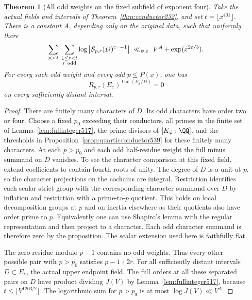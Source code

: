 \documentclass[a4paper,11pt]{article}
\newtheorem{theorem}[proposition]{Theorem}
\theoremstyle{definition}
\theoremstyle{remark}
\numberwithin{equation}{section}
\begin{document}
\begin{theorem}[All odd weights on the fixed subfield of exponent four]
\leavevmode\label{thm:oddquarticfield539}
Take the actual fields and intervals of
Theorem~\ref{thm:conductor232}, and set \(t=\lfloor x^{401}\rfloor\).
There is a constant \(A\), depending only on the original data,
such that uniformly there
\[
 \sum_{p>2}\ \sum_{\substack{1\le r<t\\ r\ {\rm odd}}}
   \log\big|\mathcal S_{p,r}(D)^{c=-1}\big|
        \ \ll_{\psi,\varepsilon}\ V^A+\exp(x^{2\varepsilon/3}).
\]
For every such odd weight and every odd \(p\le P(x)\), one has
\[
                 R_{p,r}(E_x)^{\operatorname{Gal}(E_x/D)}=0
\]
on every sufficiently distant interval.
\end{theorem}
\begin{proof}
There are finitely many characters of \(D\). Its odd characters
have order two or four. Choose a fixed \(p_0\) exceeding their
conductors, all primes in the finite set of
Lemma~\ref{lem:fullinteger517}, the prime divisors of
\([K_\psi:\QQ]\), and the thresholds in
Proposition~\ref{prop:quarticconductor539} for these finitely
many characters. At each \(p>p_0\) and each odd half-residue
weight the full minus summand on \(D\) vanishes. To see the
character comparison at this fixed field, extend coefficients
to contain fourth roots of unity. The degree of \(D\) is a
unit at \(p\), so the character projections on the cochains
are integral. Restriction identifies each scalar strict group
with the corresponding character summand over \(D\) by inflation
and restriction with a prime-to-\(p\) quotient. This holds on
local decomposition groups at \(p\) and on inertia elsewhere
as their quotients also have order prime to \(p\). Equivalently
one can use Shapiro's lemma with the regular representation
and then project to a character. Each odd character summand is
therefore zero by the proposition. The scalar extension used here
is faithfully flat.

The zero residue modulo \(p-1\) contains no odd weights.
Thus every other possible pair with \(p>p_0\) satisfies
\(p-1\nmid2r\). For all sufficiently distant intervals
\(D\subset E_*\), the actual upper endpoint field. The full
orders at all these separated pairs on \(D\) have product
dividing \(J(V)\) by Lemma~\ref{lem:fullinteger517}, because
\(t\le\lfloor V^{1203/2}\rfloor\). The logarithmic sum for
\(p>p_0\) is at most \(\log J(V)\ll V^A\).


\end{proof}
\end{document}
